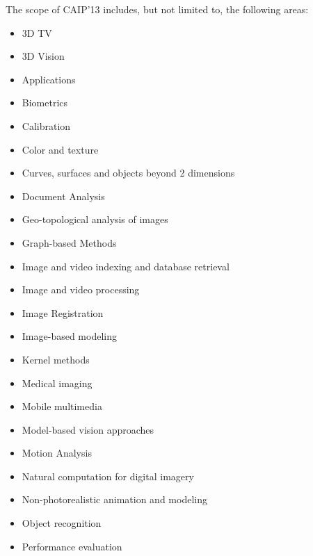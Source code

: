 \documentclass{llncs}
\begin{document}
The scope of CAIP'13 includes, but not limited to, the following areas:
\begin{itemize}
\item 3D TV

\item 3D Vision

\item Applications

\item Biometrics

\item Calibration

\item Color and texture

\item Curves, surfaces and objects beyond 2 dimensions

\item Document Analysis

\item Geo-topological analysis of images

\item Graph-based Methods

\item Image and video indexing and database retrieval

\item Image and video processing

\item Image Registration

\item Image-based modeling

\item Kernel methods

\item Medical imaging

\item Mobile multimedia

\item Model-based vision approaches

\item Motion Analysis

\item Natural computation for digital imagery

\item Non-photorealistic animation and modeling

\item Object recognition

\item Performance evaluation


\end{itemize}
\end{document}

